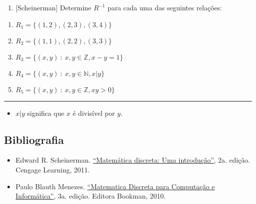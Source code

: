 \begin{enumerate}
\def\labelenumi{\arabic{enumi}.}
\setcounter{enumi}{1}
\item
  {[}Scheinerman{]} Determine \(R^{-1}\) para cada uma das seguintes
  relações:
\end{enumerate}

\begin{enumerate}
\def\labelenumi{\alph{enumi})}
\item
  \(R_1=\{(1,2),(2,3),(3,4)\}\)
\item
  \(R_2=\{(1,1),(2,2),(3,3)\}\)
\item
  \(R_3=\{(x,y)\ :\ x,y \in \mathbb{Z}, x-y=1\}\)
\item
  \(R_4=\{(x,y)\ :\ x,y \in \mathbb{N}, x|y\}\)
\item
  \(R_5=\{(x,y)\ :\ x,y \in \mathbb{Z}, xy>0\}\)
\end{enumerate}

\begin{center}\rule{0.5\linewidth}{0.5pt}\end{center}

\begin{itemize}
\item
  \(x|y\) significa que \(x\) é divisível por \(y\).
\end{itemize}

    \hypertarget{bibliografia}{%
\subsection{Bibliografia}\label{bibliografia}}

\begin{itemize}
\item
  Edward R. Scheinerman.
  \href{https://www.amazon.com.br/Matem\%C3\%A1tica-discreta-introdu\%C3\%A7\%C3\%A3o-Edward-Scheinerman/dp/8522125341/}{``Matemática
  discreta: Uma introdução''}, 2a. edição. Cengage Learning, 2011.
\item
  Paulo Blauth Menezes.
  \href{https://www.amazon.com.br/Matem\%C3\%A1tica-Discreta-para-Computa\%C3\%A7\%C3\%A3o-Inform\%C3\%A1tica/dp/8582600240}{``Matematica
  Discreta para Computação e Informática''}, 3a. edição. Editora
  Bookman, 2010.
\end{itemize}
